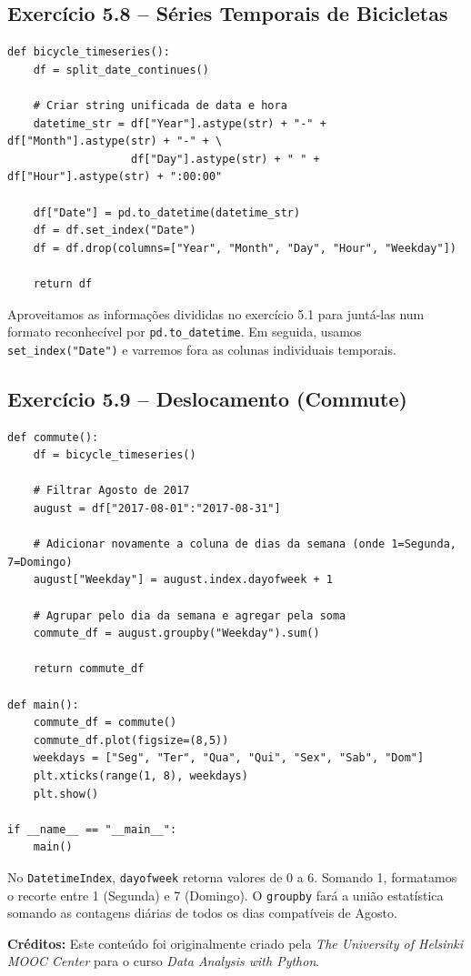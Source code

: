 \documentclass[11pt,a4paper]{article}
\begin{document}
\subsection*{Exercício 5.8 -- Séries Temporais de Bicicletas}
\begin{solucao}
\begin{lstlisting}
def bicycle_timeseries():
    df = split_date_continues()
    
    # Criar string unificada de data e hora
    datetime_str = df["Year"].astype(str) + "-" + df["Month"].astype(str) + "-" + \
                   df["Day"].astype(str) + " " + df["Hour"].astype(str) + ":00:00"
                   
    df["Date"] = pd.to_datetime(datetime_str)
    df = df.set_index("Date")
    df = df.drop(columns=["Year", "Month", "Day", "Hour", "Weekday"])
    
    return df
\end{lstlisting}
Aproveitamos as informações divididas no exercício 5.1 para juntá-las num formato reconhecível por \texttt{pd.to\_datetime}. Em seguida, usamos \texttt{set\_index("Date")} e varremos fora as colunas individuais temporais.
\end{solucao}

\subsection*{Exercício 5.9 -- Deslocamento (Commute)}
\begin{solucao}
\begin{lstlisting}
def commute():
    df = bicycle_timeseries()
    
    # Filtrar Agosto de 2017
    august = df["2017-08-01":"2017-08-31"]
    
    # Adicionar novamente a coluna de dias da semana (onde 1=Segunda, 7=Domingo)
    august["Weekday"] = august.index.dayofweek + 1
    
    # Agrupar pelo dia da semana e agregar pela soma
    commute_df = august.groupby("Weekday").sum()
    
    return commute_df

def main():
    commute_df = commute()
    commute_df.plot(figsize=(8,5))
    weekdays = ["Seg", "Ter", "Qua", "Qui", "Sex", "Sab", "Dom"]
    plt.xticks(range(1, 8), weekdays)
    plt.show()

if __name__ == "__main__":
    main()
\end{lstlisting}
No \texttt{DatetimeIndex}, \texttt{dayofweek} retorna valores de 0 a 6. Somando 1, formatamos o recorte entre 1 (Segunda) e 7 (Domingo). O \texttt{groupby} fará a união estatística somando as contagens diárias de todos os dias compatíveis de Agosto.
\end{solucao}

\vspace{2em}
\noindent\textbf{Créditos:} Este conteúdo foi originalmente criado pela \textit{The University of Helsinki MOOC Center} para o curso \textit{Data Analysis with Python}.
\end{document}
